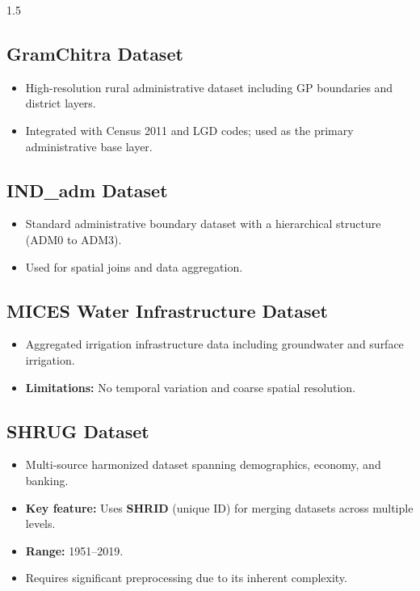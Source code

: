 \documentclass[12pt,a4paper]{report}
\begin{document}
\begin{spacing}{1.5}
\subsection{GramChitra Dataset}
\begin{itemize}
    \item High-resolution rural administrative dataset including GP boundaries and district layers.
    \item Integrated with Census 2011 and LGD codes; used as the primary administrative base layer.
\end{itemize}

\subsection{IND\_adm Dataset}
\begin{itemize}
    \item Standard administrative boundary dataset with a hierarchical structure (ADM0 to ADM3).
    \item Used for spatial joins and data aggregation.
\end{itemize}

\subsection{MICES Water Infrastructure Dataset}
\begin{itemize}
    \item Aggregated irrigation infrastructure data including groundwater and surface irrigation.
    \item \textbf{Limitations:} No temporal variation and coarse spatial resolution.
\end{itemize}

\subsection{SHRUG Dataset}
\begin{itemize}
    \item Multi-source harmonized dataset spanning demographics, economy, and banking.
    \item \textbf{Key feature:} Uses \textbf{SHRID} (unique ID) for merging datasets across multiple levels.
    \item \textbf{Range:} 1951–2019.
    \item Requires significant preprocessing due to its inherent complexity.
\end{itemize}


\end{spacing}
\end{document}
